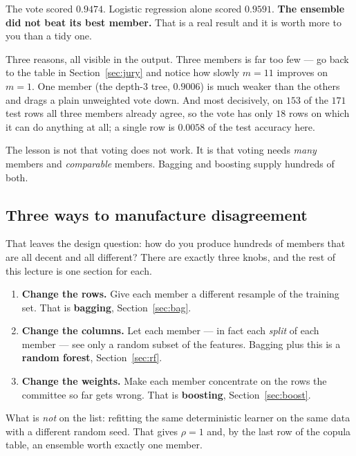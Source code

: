 \documentclass[11pt]{article}
\begin{document}
\begin{caution}
The vote scored $0.9474$. Logistic regression alone scored $0.9591$.
\textbf{The ensemble did not beat its best member.} That is a real result and
it is worth more to you than a tidy one.

Three reasons, all visible in the output. Three members is far too few --- go
back to the table in Section~\ref{sec:jury} and notice how slowly $m = 11$
improves on $m = 1$. One member (the depth-3 tree, $0.9006$) is much weaker
than the others and drags a plain unweighted vote down. And most decisively,
on $153$ of the $171$ test rows all three members already agree, so the vote
has only $18$ rows on which it can do anything at all; a single row is
$0.0058$ of the test accuracy here.

The lesson is not that voting does not work. It is that voting needs
\emph{many} members and \emph{comparable} members. Bagging and boosting supply
hundreds of both.
\end{caution}

\subsection{Three ways to manufacture disagreement}

That leaves the design question: how do you produce hundreds of members that
are all decent and all different? There are exactly three knobs, and the rest
of this lecture is one section for each.

\begin{enumerate}[leftmargin=*]
  \item \textbf{Change the rows.} Give each member a different resample of the
    training set. That is \textbf{bagging}, Section~\ref{sec:bag}.
  \item \textbf{Change the columns.} Let each member --- in fact each
    \emph{split} of each member --- see only a random subset of the features.
    Bagging plus this is a \textbf{random forest},
    Section~\ref{sec:rf}.
  \item \textbf{Change the weights.} Make each member concentrate on the rows
    the committee so far gets wrong. That is \textbf{boosting},
    Section~\ref{sec:boost}.
\end{enumerate}

What is \emph{not} on the list: refitting the same deterministic learner on
the same data with a different random seed. That gives $\rho = 1$ and, by the
last row of the copula table, an ensemble worth exactly one member.
\end{document}
